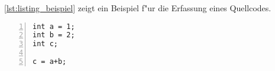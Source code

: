 \label{cha:versuchsdurchfuehrung}

\lstlistingname~\ref{lst:listing_beispiel} zeigt ein Beispiel f"ur die Erfassung eines Quellcodes.

\begin{lstlisting}[caption={[Kurzbezeichnung des Listings f"ur das Quellcodeverzeichnis]Beispiel eines Quellcodes\atlbe},label=lst:listing_beispiel,numbers=left,stepnumber=1,breaklines=true,frame=single]
int a = 1;
int b = 2;
int c;

c = a+b;

\end{lstlisting}